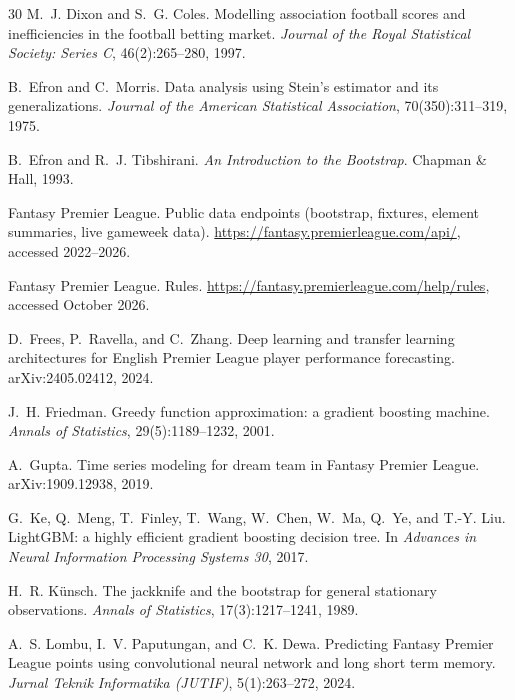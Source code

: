 \documentclass[11pt,a4paper]{article}
\begin{document}
\begin{thebibliography}{30}
M.~J. Dixon and S.~G. Coles.
\newblock Modelling association football scores and inefficiencies in the football betting market.
\newblock \emph{Journal of the Royal Statistical Society: Series C}, 46(2):265--280, 1997.

B.~Efron and C.~Morris.
\newblock Data analysis using Stein's estimator and its generalizations.
\newblock \emph{Journal of the American Statistical Association}, 70(350):311--319, 1975.

B.~Efron and R.~J. Tibshirani.
\newblock \emph{An Introduction to the Bootstrap}.
\newblock Chapman \& Hall, 1993.

Fantasy Premier League.
\newblock Public data endpoints (bootstrap, fixtures, element summaries, live gameweek data).
\newblock \url{https://fantasy.premierleague.com/api/}, accessed 2022--2026.

Fantasy Premier League.
\newblock Rules.
\newblock \url{https://fantasy.premierleague.com/help/rules}, accessed October 2026.

D.~Frees, P.~Ravella, and C.~Zhang.
\newblock Deep learning and transfer learning architectures for English Premier League player performance forecasting.
\newblock arXiv:2405.02412, 2024.

J.~H. Friedman.
\newblock Greedy function approximation: a gradient boosting machine.
\newblock \emph{Annals of Statistics}, 29(5):1189--1232, 2001.

A.~Gupta.
\newblock Time series modeling for dream team in Fantasy Premier League.
\newblock arXiv:1909.12938, 2019.

G.~Ke, Q.~Meng, T.~Finley, T.~Wang, W.~Chen, W.~Ma, Q.~Ye, and T.-Y. Liu.
\newblock LightGBM: a highly efficient gradient boosting decision tree.
\newblock In \emph{Advances in Neural Information Processing Systems 30}, 2017.

H.~R. K\"unsch.
\newblock The jackknife and the bootstrap for general stationary observations.
\newblock \emph{Annals of Statistics}, 17(3):1217--1241, 1989.

A.~S. Lombu, I.~V. Paputungan, and C.~K. Dewa.
\newblock Predicting Fantasy Premier League points using convolutional neural network and long short term memory.
\newblock \emph{Jurnal Teknik Informatika (JUTIF)}, 5(1):263--272, 2024.


\end{thebibliography}
\end{document}
